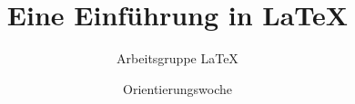 

\usepackage[ngerman]{babel}
\usepackage[utf8]{inputenc}
\usepackage[T1]{fontenc}
\usepackage{csquotes}

\usepackage{tikz}
\usetikzlibrary{shapes,arrows}
\usetikzlibrary{positioning}
\usetikzlibrary{arrows}
\usetikzlibrary{calc,fadings,decorations.pathreplacing}

\usepackage[european]{circuitikz}

\usepackage{color}
\usepackage{textcomp}

\graphicspath{{./images/}}

\renewcommand{\familydefault}{\sfdefault}

\subject{\LaTeX}

\title{Eine Einführung in \LaTeX{}}
\author[Arbeitsgruppe \LaTeX]{Arbeitsgruppe \LaTeX}
\date{Orientierungswoche \the\year{}}

\providecommand{\slideurl}{http://slides.are.here}
\providecommand{\exerciseurl}{http://exercises.are.here}

\makeatletter
\g@addto@macro\beamer@lastminutepatches{\begin{frame}
    \titlepage{}
\end{frame}}
\makeatother

\AtBeginSection{\begin{frame}
    \begin{center}
    \Huge \textbf{\secname}
    \end{center}        
\end{frame}}




